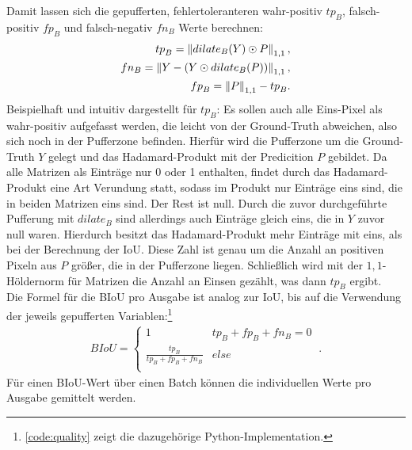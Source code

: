 Damit lassen sich die gepufferten, fehlertoleranteren wahr-positiv $tp_B$, falsch-positiv $fp_B$ und 
falsch-negativ $fn_B$ Werte berechnen: 
\begin{align}
	\label{eq:buffering} {tp}_B = \left\lVert dilate_{B}(Y) \odot P\right\rVert_{1,1} , \\
	fn_B = \left\lVert Y - (Y \odot dilate_{B}(P))\right\rVert_{1,1} , \\
	{fp}_B = \left\lVert P\right\rVert_{1,1} - {tp}_B .
\end{align}
Beispielhaft und intuitiv dargestellt für $tp_B$: Es sollen auch alle Eins-Pixel als wahr-positiv aufgefasst werden,
die leicht von der Ground-Truth abweichen, also sich noch in der Pufferzone befinden. 
Hierfür wird die Pufferzone um die Ground-Truth $Y$ gelegt und das Hadamard-Produkt mit der Predicition $P$ gebildet.
Da alle Matrizen als Einträge nur 0 oder 1 enthalten, findet durch das Hadamard-Produkt eine Art Verundung statt, 
sodass im Produkt nur Einträge eins sind, die in beiden Matrizen eins sind. Der Rest ist null. 
Durch die zuvor durchgeführte Pufferung mit $dilate_B$ sind allerdings auch Einträge gleich eins, die in $Y$ 
zuvor null waren. Hierdurch besitzt das Hadamard-Produkt mehr Einträge mit eins, als bei der Berechnung der \ac{IoU}.
Diese Zahl ist genau um die Anzahl an positiven Pixeln aus $P$ größer, die in der Pufferzone liegen. 
Schließlich wird mit der $1,1$-Höldernorm für Matrizen die Anzahl an Einsen gezählt, was dann $tp_B$ ergibt. \\
Die Formel für die \ac{BIoU} pro Ausgabe ist analog zur \ac{IoU}, bis auf die Verwendung der jeweils gepufferten 
Variablen:\footnote{\autoref{code:quality} zeigt die dazugehörige Python-Implementation.}
\begin{align}
	\label{eq:quality} BIoU = \begin{cases}
		 1 & tp_B + fp_B + fn_B = 0 \\ 
		 \frac{tp_B}{tp_B + fp_B + fn_B} & else \\
	\end{cases} ~.
\end{align}
Für einen \ac{BIoU}-Wert über einen Batch können die individuellen Werte pro Ausgabe gemittelt werden.

